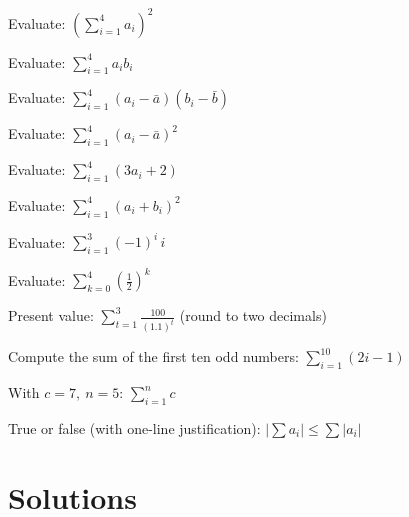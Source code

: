 \begin{problems}
  \item Evaluate: $\displaystyle\left(\sum_{i=1}^{4}a_{i}\right)^{2}$
  \item Evaluate: $\displaystyle\sum_{i=1}^{4}a_{i}b_{i}$
  \item Evaluate: $\displaystyle\sum_{i=1}^{4}(a_{i}-\bar a)(b_{i}-\bar b)$
  \item Evaluate: $\displaystyle\sum_{i=1}^{4}(a_{i}-\bar a)^{2}$
  \item Evaluate: $\displaystyle\sum_{i=1}^{4}(3a_{i}+2)$
  \item Evaluate: $\displaystyle\sum_{i=1}^{4}(a_{i}+b_{i})^{2}$
  \item Evaluate: $\displaystyle\sum_{i=1}^{3}(-1)^{i}\,i$
  \item Evaluate: $\displaystyle\sum_{k=0}^{4}\left(\frac{1}{2}\right)^{k}$
  \item Present value: $\displaystyle\sum_{t=1}^{3}\frac{100}{(1.1)^{t}}$
        (round to two decimals)
  \item Compute the sum of the first ten odd numbers:
        $\displaystyle\sum_{i=1}^{10}(2i-1)$
  \item With $c=7,\ n=5$: $\displaystyle\sum_{i=1}^{n}c$
  \item True or false (with one-line justification):
        $\displaystyle\left|\sum a_{i}\right|\le\sum|a_{i}|$
\end{problems}

\section{Solutions}

